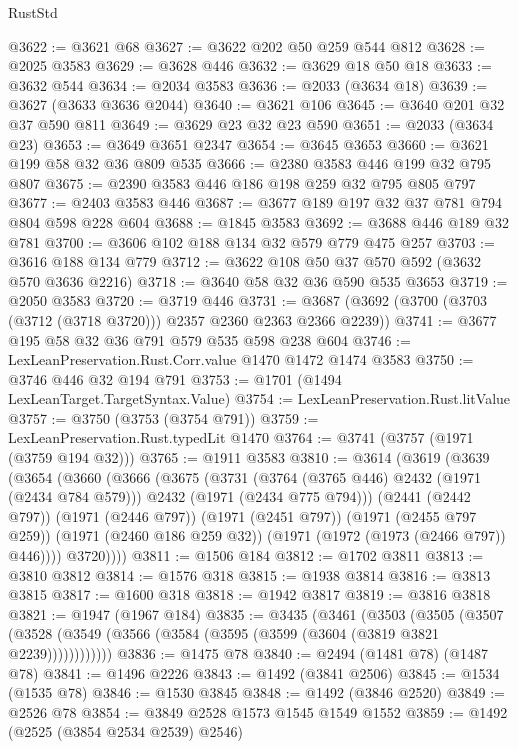 \begin{lexlean}{RustStd}
\begin{coremodule}
@3622 := @3621 @68
@3627 := @3622 @202 @50 @259 @544 @812
@3628 := @2025 @3583
@3629 := @3628 @446
@3632 := @3629 @18 @50 @18
@3633 := @3632 @544
@3634 := @2034 @3583
@3636 := @2033 (@3634 @18)
@3639 := @3627 (@3633 @3636 @2044)
@3640 := @3621 @106
@3645 := @3640 @201 @32 @37 @590 @811
@3649 := @3629 @23 @32 @23 @590
@3651 := @2033 (@3634 @23)
@3653 := @3649 @3651 @2347
@3654 := @3645 @3653
@3660 := @3621 @199 @58 @32 @36 @809 @535
@3666 := @2380 @3583 @446 @199 @32 @795 @807
@3675 := @2390 @3583 @446 @186 @198 @259 @32 @795 @805 @797
@3677 := @2403 @3583 @446
@3687 := @3677 @189 @197 @32 @37 @781 @794 @804 @598 @228 @604
@3688 := @1845 @3583
@3692 := @3688 @446 @189 @32 @781
@3700 := @3606 @102 @188 @134 @32 @579 @779 @475 @257
@3703 := @3616 @188 @134 @779
@3712 := @3622 @108 @50 @37 @570 @592 (@3632 @570 @3636 @2216)
@3718 := @3640 @58 @32 @36 @590 @535 @3653
@3719 := @2050 @3583
@3720 := @3719 @446
@3731 := @3687 (@3692 (@3700 (@3703 (@3712 (@3718 @3720))) @2357 @2360 @2363 @2366 @2239))
@3741 := @3677 @195 @58 @32 @36 @791 @579 @535 @598 @238 @604
@3746 := LexLeanPreservation.Rust.Corr.value @1470 @1472 @1474 @3583
@3750 := @3746 @446 @32 @194 @791
@3753 := @1701 (@1494 LexLeanTarget.TargetSyntax.Value)
@3754 := LexLeanPreservation.Rust.litValue
@3757 := @3750 (@3753 (@3754 @791))
@3759 := LexLeanPreservation.Rust.typedLit @1470
@3764 := @3741 (@3757 (@1971 (@3759 @194 @32)))
@3765 := @1911 @3583
@3810 := @3614
    (@3619
      (@3639
        (@3654
          (@3660
            (@3666
              (@3675
                (@3731
                  (@3764 (@3765 @446) @2432 (@1971 (@2434 @784 @579)))
                  @2432
                  (@1971 (@2434 @775 @794)))
                (@2441 (@2442 @797))
                (@1971 (@2446 @797))
                (@1971 (@2451 @797))
                (@1971 (@2455 @797 @259))
                (@1971 (@2460 @186 @259 @32))
                (@1971 (@1972 (@1973 (@2466 @797)) @446))))
            @3720))))
@3811 := @1506 @184
@3812 := @1702 @3811
@3813 := @3810 @3812
@3814 := @1576 @318
@3815 := @1938 @3814
@3816 := @3813 @3815
@3817 := @1600 @318
@3818 := @1942 @3817
@3819 := @3816 @3818
@3821 := @1947 (@1967 @184)
@3835 := @3435
    (@3461
      (@3503
        (@3505
          (@3507 (@3528 (@3549 (@3566 (@3584 (@3595 (@3599 (@3604 (@3819 @3821 @2239))))))))))))
@3836 := @1475 @78
@3840 := @2494 (@1481 @78) (@1487 @78)
@3841 := @1496 @2226
@3843 := @1492 (@3841 @2506)
@3845 := @1534 (@1535 @78)
@3846 := @1530 @3845
@3848 := @1492 (@3846 @2520)
@3849 := @2526 @78
@3854 := @3849 @2528 @1573 @1545 @1549 @1552
@3859 := @1492 (@2525 (@3854 @2534 @2539) @2546)

\end{coremodule}
\end{lexlean}
